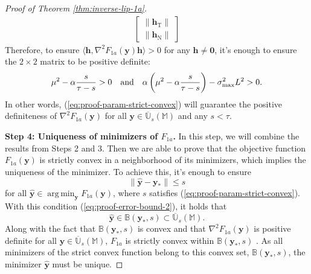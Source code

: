 \documentclass{amsart} %
\def\eqref#1{equation~\ref{#1}}
\def\vzero{{\bm{0}}}
\def\vh{{\bm{h}}}
\def\vy{{\bm{y}}}
\def\sB{{\mathbb{B}}}
\def\sM{{\mathbb{M}}}
\def\sU{{\mathbb{U}}}
\DeclareMathOperator*{\argmin}{arg\,min}
\theoremstyle{definition}
\theoremstyle{remark}
\renewcommand{\eqref}[1]{\textup{(\ref{#1})}}
\begin{document}
\begin{proof}[Proof of Theorem \ref{thm:inverse-lip-1a}]
\begin{align*}
\begin{bmatrix}
     \|\vh_{\mathrm{T}}\| \\  \|\vh_{\mathrm{N}}\|
\end{bmatrix}
\end{align*}
Therefore, to ensure $\langle \vh, \nabla^2 F_{1a}(\vy) \vh \rangle > 0$ for any $\vh \neq \vzero$, it's enough to ensure the $2\times 2$ matrix to be positive definite:
\begin{equation}
\label{eq:proof-param-strict-convex}
\mu^2 - \alpha \frac{s}{\tau - s} > 0 \quad \textup{and} \quad \alpha \left(\mu^2 - \alpha \frac{s}{\tau - s}\right) - \sigma^2_{\textup{max}}L^2 > 0. 
\end{equation}
In other words, \eqref{eq:proof-param-strict-convex} will guarantee the positive definiteness of $\nabla^2 F_{1a}(\vy)$ for all $\vy \in \overline{\sU}_s(\sM)$ and any $s < \tau$.

\textbf{Step 4: Uniqueness of minimizers of $F_{1a}$.} In this step, we will combine the results from Steps 2 and 3. Then we are able to prove that the objective function $F_{1a}(\vy)$ is strictly convex in a neighborhood of its minimizers, which implies the uniqueness of the minimizer. To achieve this, it's enough to ensure
\begin{equation}
\label{eq:proof-error-bound-2}
\|\hat{\vy} - \vy_\ast\| \leq s
\end{equation}
for all $\hat{\vy} \in \argmin_{\vy} F_{1a}(\vy)$, where $s$ satisfies \eqref{eq:proof-param-strict-convex}. With this condition \eqref{eq:proof-error-bound-2}, it holds that 
\[ \hat{\vy} \in \sB(\vy_\ast, s) \subset \overline{\sU}_s(\sM). \]
Along with the fact that $\sB(\vy_\ast, s)$ is convex and that $\nabla^2 F_{1a}(\vy)$ is positive definite for all $\vy \in \overline{\sU}_s(\sM)$, $F_{1a}$ is strictly convex within $\sB(\vy_\ast, s)$ \cite[Section 3.1.4]{boyd2004convex}. As all minimizers of the strict convex function belong to this convex set, $\sB(\vy_\ast, s)$, the minimizer $\hat{\vy}$ must be unique. 


\end{proof}
\end{document}
